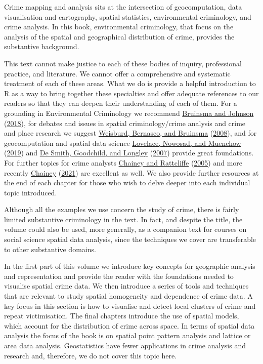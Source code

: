 \documentclass[
]{book}
\begin{document}
Crime mapping and analysis sits at the intersection of geocomputation, data visualisation and cartography, spatial statistics, environmental criminology, and crime analysis. In this book, environmental criminology, that focus on the analysis of the spatial and geographical distribution of crime, provides the substantive background.

This text cannot make justice to each of these bodies of inquiry, professional practice, and literature. We cannot offer a comprehensive and systematic treatment of each of these areas. What we do is provide a helpful introduction to R as a way to bring together these specialties and offer adequate references to our readers so that they can deepen their understanding of each of them. For a grounding in Environmental Criminology we recommend \protect\hyperlink{ref-Bruinsma_2018}{Bruinsma and Johnson} (\protect\hyperlink{ref-Bruinsma_2018}{2018}), for debates and issues in spatial criminology/crime analysis and crime and place research we suggest \protect\hyperlink{ref-Weisburd_2008}{Weisburd, Bernasco, and Bruinsma} (\protect\hyperlink{ref-Weisburd_2008}{2008}), and for geocomputation and spatial data science \protect\hyperlink{ref-Lovelace_2019}{Lovelace, Nowosad, and Muenchow} (\protect\hyperlink{ref-Lovelace_2019}{2019}) and \protect\hyperlink{ref-DeSmith_2007}{De Smith, Goodchild, and Longley} (\protect\hyperlink{ref-DeSmith_2007}{2007}) provide great foundations. For further topics for crime analysts \protect\hyperlink{ref-Chainey_2005}{Chainey and Rattcliffe} (\protect\hyperlink{ref-Chainey_2005}{2005}) and more recently \protect\hyperlink{ref-Chainey_2021}{Chainey} (\protect\hyperlink{ref-Chainey_2021}{2021}) are excellent as well. We also provide further resources at the end of each chapter for those who wish to delve deeper into each individual topic introduced.

Although all the examples we use concern the study of crime, there is fairly limited substantive criminology in the text. In fact, and despite the title, the volume could also be used, more generally, as a companion text for courses on social science spatial data analysis, since the techniques we cover are transferable to other substantive domains.

In the first part of this volume we introduce key concepts for geographic analysis and representation and provide the reader with the foundations needed to visualise spatial crime data. We then introduce a series of tools and techniques that are relevant to study spatial homogeneity and dependence of crime data. A key focus in this section is how to visualise and detect local clusters of crime and repeat victimisation. The final chapters introduce the use of spatial models, which account for the distribution of crime across space. In terms of spatial data analysis the focus of the book is on spatial point pattern analysis and lattice or area data analysis. Geostatistics have fewer applications in crime analysis and research and, therefore, we do not cover this topic here.
\end{document}
